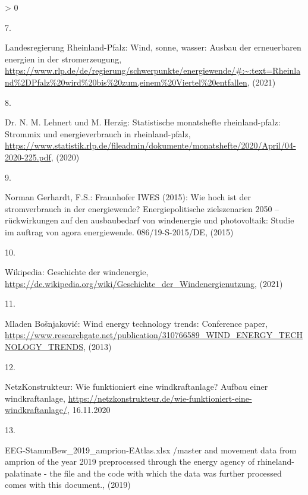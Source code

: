 \documentclass[a4paper,11pt]{article}
\newlength{\cslhangindent}
\newlength{\csllabelwidth}
\newenvironment{CSLReferences}[3] %
 {%
  \setlength{\parindent}{0pt}
  \ifodd #1 \everypar{\setlength{\hangindent}{\cslhangindent}}\ignorespaces\fi
  \ifnum #2 > 0
  \setlength{\parskip}{#2\baselineskip}
  \fi
 }%
 {}
\newcommand{\CSLLeftMargin}[1]{\parbox[t]{\maxof{\widthof{#1}}{\csllabelwidth}}{#1}}
\newcommand{\CSLRightInline}[1]{\parbox[t]{\linewidth}{#1}}
\begin{document}
\begin{CSLReferences}{0}{0}
\leavevmode\hypertarget{ref-LandesregierungRheinlandPfalz.2021}{}%
\CSLLeftMargin{7. }
\CSLRightInline{Landesregierung Rheinland-Pfalz: Wind, sonne, wasser: Ausbau der erneuerbaren energien in der stromerzeugung, \url{https://www.rlp.de/de/regierung/schwerpunkte/energiewende/\#:~:text=Rheinland\%2DPfalz\%20wird\%20bis\%20zum,einem\%20Viertel\%20entfallen}, (2021)}

\leavevmode\hypertarget{ref-Lehnert.2020}{}%
\CSLLeftMargin{8. }
\CSLRightInline{Dr. N. M. Lehnert und M. Herzig: Statistische monatshefte rheinland-pfalz: Strommix und energieverbrauch in rheinland-pfalz, \url{https://www.statistik.rlp.de/fileadmin/dokumente/monatshefte/2020/April/04-2020-225.pdf}, (2020)}

\leavevmode\hypertarget{ref-NormanGerhardt.2015}{}%
\CSLLeftMargin{9. }
\CSLRightInline{Norman Gerhardt, F.S.: Fraunhofer IWES (2015): Wie hoch ist der stromverbrauch in der energiewende? Energiepolitische zielszenarien 2050 -- r{ü}ckwirkungen auf den ausbaubedarf von windenergie und photovoltaik: Studie im auftrag von agora energiewende. 086/19-S-2015/DE, (2015)}

\leavevmode\hypertarget{ref-Wikipedia.2021}{}%
\CSLLeftMargin{10. }
\CSLRightInline{Wikipedia: Geschichte der windenergie, \url{https://de.wikipedia.org/wiki/Geschichte_der_Windenergienutzung}, (2021)}

\leavevmode\hypertarget{ref-MladenBosnjakovic.2013}{}%
\CSLLeftMargin{11. }
\CSLRightInline{Mladen Bošnjaković: Wind energy technology trends: Conference paper, \url{https://www.researchgate.net/publication/310766589_WIND_ENERGY_TECHNOLOGY_TRENDS}, (2013)}

\leavevmode\hypertarget{ref-NetzKonstrukteur.16.11.2020}{}%
\CSLLeftMargin{12. }
\CSLRightInline{NetzKonstrukteur: Wie funktioniert eine windkraftanlage? Aufbau einer windkraftanlage, \url{https://netzkonstrukteur.de/wie-funktioniert-eine-windkraftanlage/}, 16.11.2020}

\leavevmode\hypertarget{ref-EnergieagenturRheinlandPfalz.2019}{}%
\CSLLeftMargin{13. }
\CSLRightInline{EEG-StammBew{\_}2019{\_}amprion-EAtlas.xlsx /master and movement data from amprion of the year 2019 preprocessed through the energy agency of rhineland-palatinate - the file and the code with which the data was further processed comes with this document., (2019)}

\end{CSLReferences}
\indent
\setlength{\parindent}{17pt}
\setlength{\leftskip}{0pt}
\setlength{\parskip}{0pt}
\end{document}
